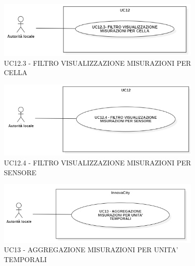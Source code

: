 \begin{figure}[H]
    \centering
    \includegraphics[width=0.9\textwidth]{../Images/uc12.3.PNG}
    \caption{UC12.3 - FILTRO VISUALIZZAZIONE MISURAZIONI PER CELLA }
\end{figure}


\begin{figure}[H]
    \centering
    \includegraphics[width=0.9\textwidth]{../Images/uc12.4.PNG}
    \caption{UC12.4 - FILTRO VISUALIZZAZIONE MISURAZIONI PER SENSORE }
\end{figure}



\begin{figure}[H]
    \centering
    \includegraphics[width=0.9\textwidth]{../Images/uc13.PNG}
    \caption{UC13 - AGGREGAZIONE MISURAZIONI PER UNITA' TEMPORALI }
\end{figure}




